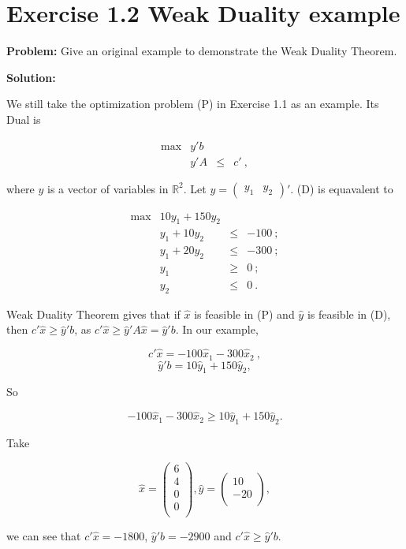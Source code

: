 \section{Exercise 1.2 Weak Duality example}
\textbf{Problem:} Give an original example to demonstrate the Weak Duality Theorem.

\textbf{Solution:}

We still take the optimization problem (P) in Exercise 1.1 as an example. Its Dual is

\[
\begin{array}{rrcl}
 \max & y'b  &      &   \\
      &  y'A  &   \leq  & c'~,
\end{array}
\tag{D}
\]

where $y$ is a vector of variables in $ \mathbb{R}^2$. Let 
$y = 
\left(
\begin{array}{cc}
 y_1 & y_2 
\end{array}
\right)'$. (D) is equavalent to 

\[
\begin{array}{rrcl}
 \max & 10y_1+150y_2  &      &   \\
      &  y_1+10y_2  &   \leq  & -100~; \\
      & y_1 + 20y_2 & \leq & -300~; \\
      & y_1 & \geq & 0~;\\
      & y_2 & \leq & 0~.
\end{array}
\]

Weak Duality Theorem gives that if $\hat{x}$ is feasible in (P) and $\hat{y}$ is feasible in (D), then $c'\hat{x} \geq \hat{y}'b$, as $c'\hat{x} \geq \hat{y}'A\hat{x} = \hat{y}'b$. In our example,

$$c'\hat{x} = -100\hat{x}_1 - 300 \hat{x}_2~,$$
$$\hat{y}'b = 10\hat{y}_1 + 150\hat{y}_2,$$

So

$$-100\hat{x}_1 - 300 \hat{x}_2 \geq 10\hat{y}_1 + 150\hat{y}_2.$$

Take \

$$\hat{x} = 
\left(
\begin{array}{c}
 6 \\
 4 \\
 0 \\
 0 \\
\end{array}
\right),
\hat{y} =
\left(
\begin{array}{c}
 10 \\
 -20 \\
\end{array}
\right),
$$

we can see that $c'\hat{x} = -1800$, $\hat{y}'b = -2900$ and $c'\hat{x} \geq \hat{y}'b$.